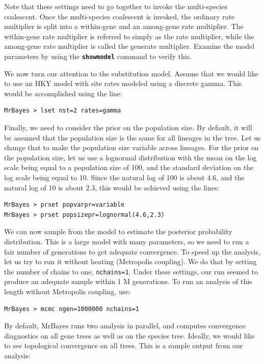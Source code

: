 \documentclass[12pt]{book}
\newcommand{\ttt}[1]{\texttt{#1}}
\newcommand{\tb}[1]{\ttt{\textbf{#1}}}
\begin{document}
Note that these settings need to go together to invoke the multi-species coalescent. Once the
multi-species coalescent is invoked, the ordinary rate multiplier is split into a within-gene and
an among-gene rate multiplier. The within-gene rate multiplier is referred to simply as the rate
multiplier, while the among-gene rate multiplier is called the generate multiplier. Examine the
model parameters by using the \tb{showmodel} command to verify this.

We now turn our attention to the substitution model. Assume that we would like to use an HKY model
with site rates modeled using a discrete gamma. This would be accomplished using the line:

\begin{Verbatim}
MrBayes > lset nst=2 rates=gamma
\end{Verbatim}

Finally, we need to consider the prior on the population size. By default, it will be assumed that
the population size is the same for all lineages in the tree. Let us change that to make the
population size variable across lineages. For the prior on the population size, let us use a
lognormal distribution with the mean on the log scale being equal to a population size of 100, and
the standard deviation on the log scale being equal to 10. Since the natural log of 100 is about
$4.6$, and the natural log of 10 is about $2.3$, this would be achieved using the lines:

\begin{Verbatim}
MrBayes > prset popvarpr=variable
MrBayes > prset popsizepr=lognormal(4.6,2.3)
\end{Verbatim}

We can now sample from the model to estimate the posterior probability distribution. This is a
large model with many parameters, so we need to run a fair number of generations to get adequate
convergence. To speed up the analysis, let us try to run it without heating (Metropolis coupling).
We do that by setting the number of chains to one, \texttt{nchains=1}. Under these settings, our
run seemed to produce an adequate sample within 1 M generations. To run an analysis of this length
without Metropolis coupling, use:

\begin{Verbatim}
MrBayes > mcmc ngen=1000000 nchains=1
\end{Verbatim}

By default, MrBayes runs two analysis in parallel, and computes convergence diagnostics on all gene
trees as well as on the species tree. Ideally, we would like to see topological convergence on all
trees. This is a sample output from our analysis:
\end{document}
